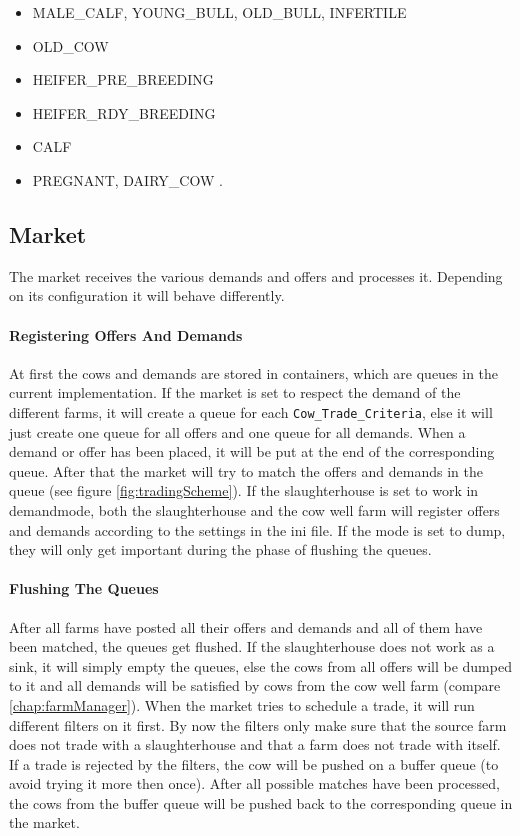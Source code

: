 \begin{itemize}
\item MALE\_CALF, YOUNG\_BULL, OLD\_BULL, INFERTILE
\item OLD\_COW
\item HEIFER\_PRE\_BREEDING  
\item HEIFER\_RDY\_BREEDING
\item CALF
\item PREGNANT, DAIRY\_COW .
\end{itemize}

\subsection{Market}\label{chap:market}
The market receives the various demands and offers and processes it. Depending on its configuration it will behave differently.
\paragraph{Registering Offers And Demands}
At first the cows and demands are stored in containers, which are queues in the current implementation. If the market is set to respect the demand of the different farms, it will create a queue for each {\tt Cow\_Trade\_Criteria}, else it will just create one queue for all offers and one queue for all demands. When a demand or offer has been placed, it will be put at the end of the corresponding queue. After that the market will try to match the offers and demands in the queue (see figure \ref{fig:tradingScheme}). If the slaughterhouse is set to work in \glqq demand\grqq mode, both the slaughterhouse and the cow well farm will register offers and demands according to the settings in the ini file. If the mode is set to \glqq dump\grqq, they will only get important during the phase of flushing the queues.

\paragraph{Flushing The Queues}
After all farms have posted all their offers and demands and all of them have been matched, the queues get flushed. If the slaughterhouse does not work as a sink, it will simply empty the queues, else the cows from all offers will be dumped to it and all demands will be satisfied by cows from the cow well farm (compare \ref{chap:farmManager}). When the market tries to schedule a trade, it will run different filters on it first. By now the filters only make sure that the source farm does not trade with a slaughterhouse and that a farm does not trade with itself. If a trade is rejected by the filters, the cow will be pushed on a buffer queue (to avoid trying it more then once). After all possible matches have been processed, the cows from the buffer queue will be pushed back to the corresponding queue in the market.

